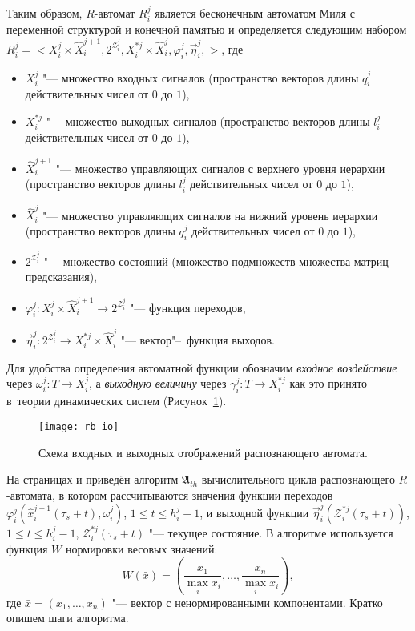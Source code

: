 Таким образом, $R$-автомат $R_i^j$ является бесконечным автоматом Миля с переменной структурой и конечной памятью и определяется следующим набором $R_i^j=<X_i^j\times \hat{X}_i^{j+1}, 2^{\mathcal Z_i^j}, X_i^{*j}\times \hat{X}_i^j,\varphi_i^j,\vec\eta_i^j,>$, где
\begin{itemize}
	\item $X_i^j$ "--- множество входных сигналов (пространство векторов длины $q_i^j$ действительных чисел от $0$ до $1$), 
	\item $X_i^{*j}$ "--- множество выходных сигналов (пространство векторов длины $l_i^j$ действительных чисел от $0$ до $1$), 
	\item $\hat{X}_i^{j+1}$ "--- множество управляющих сигналов с верхнего уровня иерархии (пространство векторов длины $l_i^j$ действительных чисел от $0$ до $1$),
	\item $\hat{X}_i^j$ "--- множество управляющих сигналов на нижний уровень иерархии (пространство векторов длины $q_i^j$ действительных чисел от $0$ до $1$),
	\item $2^{\mathcal Z_i^j}$ "--- множество состояний (множество подмножеств множества матриц предсказания),
	\item $\varphi_i^j:X_i^j\times \hat{X}_i^{j+1}\to 2^{\mathcal Z_i^j}$ "--- функция переходов,
	\item $\vec\eta_i^j:2^{\mathcal Z_i^j} \to X_i^{*j}\times \hat{X}_i^j$ "--- вектор"--~функция выходов.
\end{itemize}

Для удобства определения автоматной функции обозначим \textit{входное воздействие} через $\omega_i^j:T{\to}X_i^j$, а \textit{выходную величину} через $\gamma_i^j:T{\to}X_i^{*j}$ как это принято в~теории динамических систем \cite{Kalman1971, KalmanE1971} (Рисунок~\ref{fig:rb_io}).

\begin{figure}[h]
	\centering
	\texttt{[image: rb\_io]}
	\caption{Схема входных и выходных отображений распознающего автомата.}
	\label{fig:rb_io}
\end{figure}

На страницах \pageref{alg:th_init} и \pageref{alg:th_cycle} приведён алгоритм $\mathfrak{A}_{th}$ вычислительного цикла распознающего $R$-автомата, в котором рассчитываются значения функции переходов $\varphi_i^j(\hat{x}_i^{j+1}(\tau_s+t),\omega_i^j)$, $1\leqslant{t}\leqslant h_i^j-1$, и выходной функции $\vec\eta_i^j(\mathcal Z_i^{*j}(\tau_s+t))$, $1\leqslant{t}\leqslant h_i^j-1$, $\mathcal Z_i^{*j}(\tau_s+t)$ "--- текущее состояние. В алгоритме используется функция $W$ нормировки весовых значений:
\begin{equation}
	W(\bar x)=\left(\frac{x_1}{\max\limits_i x_i},\dots,\frac{x_n}{\max\limits_i x_i}\right),
\end{equation} 
где $\bar x=(x_1,\dots,x_n)$ "--- вектор с ненормированными компонентами. Кратко опишем шаги алгоритма.

